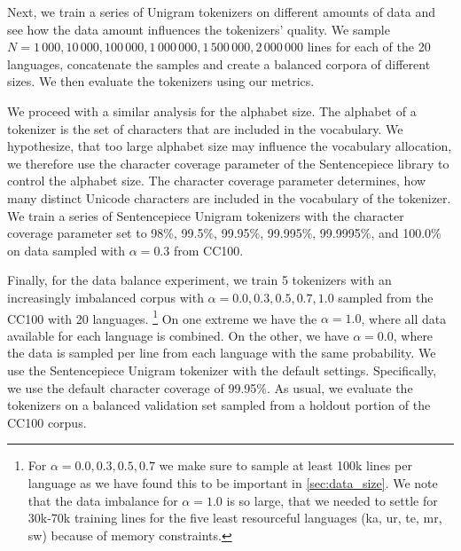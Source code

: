 Next, we train a series of Unigram tokenizers on different amounts of data and see how the data amount influences the tokenizers' quality. We sample $N = 1\,000, 10\,000, 100\,000, 1\,000\,000, 1\,500\,000, 2\,000\,000$ lines for each of the 20 languages, concatenate the samples and create a balanced corpora of different sizes. We then evaluate the tokenizers using our metrics.

We proceed with a similar analysis for the alphabet size. The alphabet of a tokenizer is the set of characters that are included in the vocabulary. We hypothesize, that too large alphabet size may influence the vocabulary allocation, we therefore use the character coverage parameter of the Sentencepiece library to control the alphabet size. The character coverage parameter determines, how many distinct Unicode characters are included in the vocabulary of the tokenizer. We train a series of Sentencepiece Unigram tokenizers with the character coverage parameter set to 98\%, 99.5\%, 99.95\%, 99.995\%, 99.9995\%, and 100.0\% on data sampled with $\alpha=0.3$ from CC100. 

Finally, for the data balance experiment, we train 5 tokenizers with an increasingly imbalanced corpus with $\alpha = 0.0, 0.3, 0.5, 0.7, 1.0$ sampled from the CC100 with 20 languages. \footnote{For $\alpha = 0.0, 0.3, 0.5, 0.7$ we make sure to sample at least 100k lines per language as we have found this to be important in \autoref{sec:data_size}. We note that the data imbalance for $\alpha=1.0$ is so large, that we needed to settle for 30k-70k training lines for the five least resourceful languages (ka, ur, te, mr, sw) because of memory constraints.} On one extreme we have the $\alpha=1.0$, where all data available for each language is combined. On the other, we have $\alpha=0.0$, where the data is sampled per line from each language with the same probability. We use the Sentencepiece Unigram tokenizer with the default settings. Specifically, we use the default character coverage of 99.95\%. As usual, we evaluate the tokenizers on a balanced validation set sampled from a holdout portion of the CC100 corpus. 


